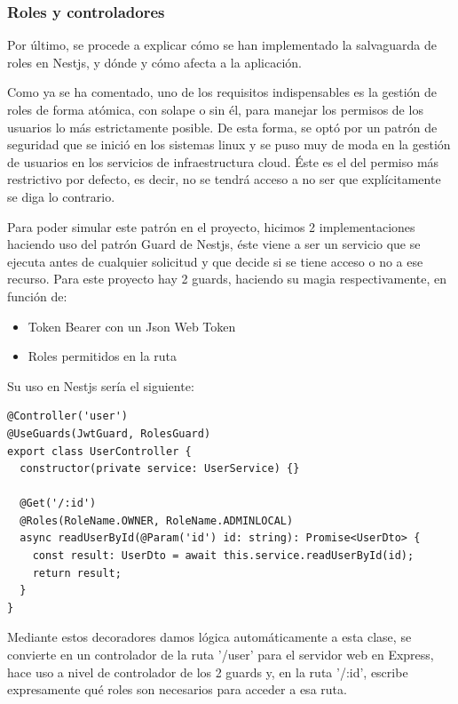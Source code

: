 \subsubsection{Roles y controladores}
Por último, se procede a explicar cómo se han implementado la salvaguarda de roles en Nestjs, y dónde y cómo afecta a la aplicación.
\vspace{1em}
\par Como ya se ha comentado, uno de los requisitos indispensables es la gestión de roles de forma atómica, con solape o sin él, para manejar los permisos de los usuarios lo más estrictamente posible. De esta forma, se optó por un patrón de seguridad que se inició en los sistemas linux y se puso muy de moda en la gestión de usuarios en los servicios de infraestructura cloud. Éste es el del permiso más restrictivo por defecto, es decir, no se tendrá acceso a no ser que explícitamente se diga lo contrario.
\vspace{1em}
\par Para poder simular este patrón en el proyecto, hicimos 2 implementaciones haciendo uso del patrón Guard de Nestjs, éste viene a ser un servicio que se ejecuta antes de cualquier solicitud y que decide si se tiene acceso o no a ese recurso. Para este proyecto hay 2 guards, haciendo su magia respectivamente, en función de:
\begin{itemize}
    \item Token Bearer con un Json Web Token
    \item Roles permitidos en la ruta
\end{itemize}
\vspace{1em}
\par Su uso en Nestjs sería el siguiente:
\begin{lstlisting}[caption={User Controller: Guards en el controlador de usuario},label=cod:controller-user-guards]
@Controller('user')
@UseGuards(JwtGuard, RolesGuard)
export class UserController {
  constructor(private service: UserService) {}
  
  @Get('/:id')
  @Roles(RoleName.OWNER, RoleName.ADMINLOCAL)
  async readUserById(@Param('id') id: string): Promise<UserDto> {
    const result: UserDto = await this.service.readUserById(id);
    return result;
  }
}
\end{lstlisting}
\vspace{1em}
\par Mediante estos decoradores damos lógica automáticamente a esta clase, se convierte en un controlador de la ruta '/user' para el servidor web en Express, hace uso a nivel de controlador de los 2 guards y, en la ruta '/:id', escribe expresamente qué roles son necesarios para acceder a esa ruta.
